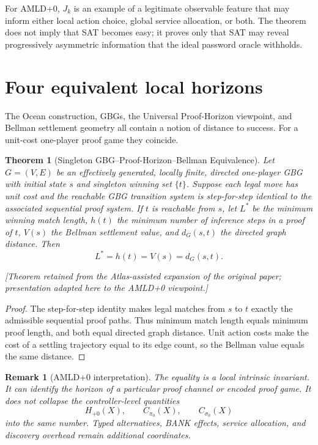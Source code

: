 \documentclass[11pt]{article}
\newtheorem{remark}[definition]{Remark}
\newtheorem{theorem}[definition]{Theorem}
\newcommand{\atlasnote}{\par\smallskip\noindent\textit{[Theorem retained from the Atlas-assisted expansion of the original paper; presentation adapted here to the AMLD+0 viewpoint.] }\par\smallskip}
\begin{document}
For AMLD+0, $J_k$ is an example of a legitimate observable feature that may
inform either local action choice, global service allocation, or both.  The
theorem does not imply that SAT becomes easy; it proves only that SAT may
reveal progressively asymmetric information that the ideal password oracle
withholds.

\section{Four equivalent local horizons}

The Ocean construction, GBGs, the Universal Proof-Horizon viewpoint, and
Bellman settlement geometry all contain a notion of distance to success.  For
a unit-cost one-player proof game they coincide.

\begin{theorem}[Singleton GBG--Proof-Horizon--Bellman Equivalence]
Let $G=(V,E)$ be an effectively generated, locally finite, directed one-player
GBG with initial state $s$ and singleton winning set $\{t\}$.  Suppose each
legal move has unit cost and the reachable GBG transition system is
step-for-step identical to the associated sequential proof system.  If $t$ is
reachable from $s$, let $L^*$ be the minimum winning match length, $h(t)$ the
minimum number of inference steps in a proof of $t$, $V(s)$ the Bellman
settlement value, and $d_G(s,t)$ the directed graph distance.  Then
\[
\boxed{L^*=h(t)=V(s)=d_G(s,t).}
\]
\end{theorem}
\atlasnote

\begin{proof}
The step-for-step identity makes legal matches from $s$ to $t$ exactly the
admissible sequential proof paths.  Thus minimum match length equals minimum
proof length, and both equal directed graph distance.  Unit action costs make
the cost of a settling trajectory equal to its edge count, so the Bellman
value equals the same distance.
\end{proof}

\begin{remark}[AMLD+0 interpretation]
The equality is a \emph{local intrinsic invariant}.  It can identify the
horizon of a particular proof channel or encoded proof game.  It does not
collapse the controller-level quantities
\[
H_{+0}(X),\qquad C_{\pi_0}(X),\qquad C_{\sigma_0}(X)
\]
into the same number.  Typed alternatives, BANK effects, service allocation,
and discovery overhead remain additional coordinates.
\end{remark}
\end{document}
